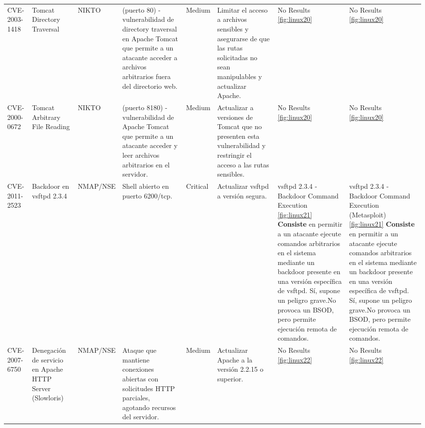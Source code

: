 \documentclass[a4paper,12pt]{article} %
\begin{document}
\begin{table}[hp!]
{\begin{tabular}{m{2.1cm}|m{2.6cm}|m{2cm}|m{4cm}|m{1cm}|m{3cm}|m{5cm}|m{5cm}}
  {CVE-2003-1418} & {Tomcat Directory Traversal} & {NIKTO} & {(puerto 80) - vulnerabilidad de directory traversal en Apache Tomcat que permite a un atacante acceder a archivos arbitrarios fuera del directorio web.} & {Medium} & {Limitar el acceso a archivos sensibles y asegurarse de que las rutas solicitadas no sean manipulables y actualizar Apache.} & {No Results \ref{fig:linux20}}  & {No Results \ref{fig:linux20}}\\
  {CVE-2000-0672} & {Tomcat Arbitrary File Reading} & {NIKTO} & {(puerto 8180) - vulnerabilidad de Apache Tomcat que permite a un atacante acceder y leer archivos arbitrarios en el servidor.} & {Medium} & {Actualizar a versiones de Tomcat que no presenten esta vulnerabilidad y restringir el acceso a las rutas sensibles.}  & {No Results \ref{fig:linux20}}  & {No Results \ref{fig:linux20}}\\

  {CVE-2011-2523} & {Backdoor en vsftpd 2.3.4} & {NMAP/NSE} & {Shell abierto en puerto 6200/tcp.} & {Critical} & {Actualizar vsftpd a versión segura.} & {vsftpd 2.3.4 - Backdoor Command Execution \ref{fig:linux21} \vspace{2mm} \hline \vspace{2mm} {\color{blue} \textbf{Consiste} en permitir a un atacante ejecute comandos arbitrarios en el sistema mediante un backdoor presente en una versión específica de vsftpd. } \vspace{2mm} \hline \vspace{2mm} {\color{red} Sí, supone un peligro grave.No provoca un BSOD, pero permite ejecución remota de comandos. }}  & {vsftpd 2.3.4 - Backdoor Command Execution (Metasploit)  \ref{fig:linux21} \vspace{2mm} \hline \vspace{2mm} {\color{blue} \textbf{Consiste} en permitir a un atacante ejecute comandos arbitrarios en el sistema mediante un backdoor presente en una versión específica de vsftpd. } \vspace{2mm} \hline \vspace{2mm} {\color{red} Sí, supone un peligro grave.No provoca un BSOD, pero permite ejecución remota de comandos. }}\\
  
  {CVE-2007-6750} & {Denegación de servicio en Apache HTTP Server (Slowloris)} & {NMAP/NSE} & {Ataque que mantiene conexiones abiertas con solicitudes HTTP parciales, agotando recursos del servidor.} & {Medium} & {Actualizar Apache a la versión 2.2.15 o superior.} & {No Results \ref{fig:linux22}}  & {No Results \ref{fig:linux22}} \\


\end{tabular}}
\end{table}
\end{document}
